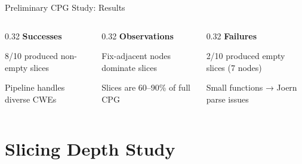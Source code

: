 \documentclass[aspectratio=169,10pt]{beamer}
\begin{document}
\begin{frame}{Preliminary CPG Study: Results}
  \vspace{0.5em}
  \begin{columns}[T]
  \begin{column}{0.32\textwidth}
    {\scriptsize\textbf{\textcolor{hit}{Successes}}}
    \begin{itemize}\itemsep1pt
      {\scriptsize
      \item 8/10 produced non-empty slices
      \item Pipeline handles diverse CWEs}
    \end{itemize}
  \end{column}
  \begin{column}{0.32\textwidth}
    {\scriptsize\textbf{\textcolor{warn}{Observations}}}
    \begin{itemize}\itemsep1pt
      {\scriptsize
      \item Fix-adjacent nodes dominate slices
      \item Slices are 60–90\% of full CPG}
    \end{itemize}
  \end{column}
  \begin{column}{0.32\textwidth}
    {\scriptsize\textbf{\textcolor{miss}{Failures}}}
    \begin{itemize}\itemsep1pt
      {\scriptsize
      \item 2/10 produced empty slices (7 nodes)
      \item Small functions → Joern parse issues}
    \end{itemize}
  \end{column}
  \end{columns}
\end{frame}


\section{Slicing Depth Study}
\end{document}

